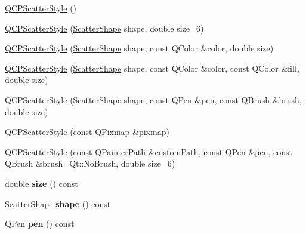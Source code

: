\begin{DoxyCompactItemize}
\item 
\hyperlink{class_q_c_p_scatter_style_a8836018d9ad83ccd8870de8315c1be73}{Q\+C\+P\+Scatter\+Style} ()
\item 
\hyperlink{class_q_c_p_scatter_style_a003d92f74f4561eda111862eadd62f28}{Q\+C\+P\+Scatter\+Style} (\hyperlink{class_q_c_p_scatter_style_adb31525af6b680e6f1b7472e43859349}{Scatter\+Shape} shape, double size=6)
\item 
\hyperlink{class_q_c_p_scatter_style_afa059da858c864c7e05871dc602d7eab}{Q\+C\+P\+Scatter\+Style} (\hyperlink{class_q_c_p_scatter_style_adb31525af6b680e6f1b7472e43859349}{Scatter\+Shape} shape, const Q\+Color \&color, double size)
\item 
\hyperlink{class_q_c_p_scatter_style_a6e1b64f12cac7f07af180ae4316fd38d}{Q\+C\+P\+Scatter\+Style} (\hyperlink{class_q_c_p_scatter_style_adb31525af6b680e6f1b7472e43859349}{Scatter\+Shape} shape, const Q\+Color \&color, const Q\+Color \&fill, double size)
\item 
\hyperlink{class_q_c_p_scatter_style_a85acc4941d7e5c9bca5fa51377a77f49}{Q\+C\+P\+Scatter\+Style} (\hyperlink{class_q_c_p_scatter_style_adb31525af6b680e6f1b7472e43859349}{Scatter\+Shape} shape, const Q\+Pen \&pen, const Q\+Brush \&brush, double size)
\item 
\hyperlink{class_q_c_p_scatter_style_a63962094587a4c2258435aa7933996cc}{Q\+C\+P\+Scatter\+Style} (const Q\+Pixmap \&pixmap)
\item 
\hyperlink{class_q_c_p_scatter_style_a879c30647683b3cfbde2afecea815e6f}{Q\+C\+P\+Scatter\+Style} (const Q\+Painter\+Path \&custom\+Path, const Q\+Pen \&pen, const Q\+Brush \&brush=Qt\+::\+No\+Brush, double size=6)
\item 
double {\bfseries size} () const \hypertarget{class_q_c_p_scatter_style_a1973ee650368f1c5f55507b78473f634}{}\label{class_q_c_p_scatter_style_a1973ee650368f1c5f55507b78473f634}

\item 
\hyperlink{class_q_c_p_scatter_style_adb31525af6b680e6f1b7472e43859349}{Scatter\+Shape} {\bfseries shape} () const \hypertarget{class_q_c_p_scatter_style_a4462a25ef17769631f4e0aa81dadca4b}{}\label{class_q_c_p_scatter_style_a4462a25ef17769631f4e0aa81dadca4b}

\item 
Q\+Pen {\bfseries pen} () const \hypertarget{class_q_c_p_scatter_style_a3c24c3bf37b561b4807aed9f1418ab58}{}\label{class_q_c_p_scatter_style_a3c24c3bf37b561b4807aed9f1418ab58}


\end{DoxyCompactItemize}
